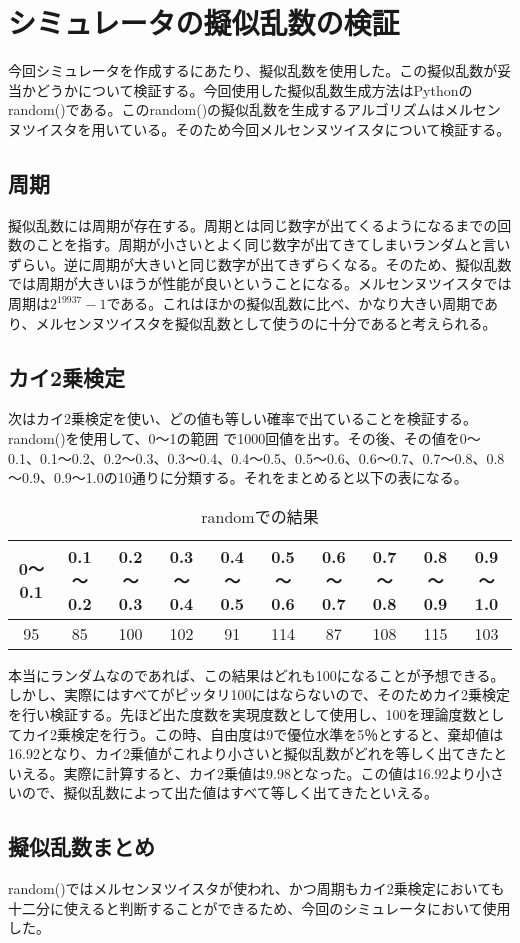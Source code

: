 \section{シミュレータの擬似乱数の検証}
今回シミュレータを作成するにあたり、擬似乱数を使用した。この擬似乱数が妥当かどうかについて検証する。今回使用した擬似乱数生成方法はPythonのrandom()である。このrandom()の擬似乱数を生成するアルゴリズムはメルセンヌツイスタを用いている。そのため今回メルセンヌツイスタについて検証する。
\subsection{周期}
擬似乱数には周期が存在する。周期とは同じ数字が出てくるようになるまでの回数のことを指す。周期が小さいとよく同じ数字が出てきてしまいランダムと言いずらい。逆に周期が大きいと同じ数字が出てきずらくなる。そのため、擬似乱数では周期が大きいほうが性能が良いということになる。メルセンヌツイスタでは周期は$2^{19937}-1$である。これはほかの擬似乱数に比べ、かなり大きい周期であり、メルセンヌツイスタを擬似乱数として使うのに十分であると考えられる。
\subsection{カイ2乗検定}
次はカイ2乗検定を使い、どの値も等しい確率で出ていることを検証する。random()を使用して、0～1の範囲
で1000回値を出す。その後、その値を0～0.1、0.1～0.2、0.2～0.3、0.3～0.4、0.4～0.5、0.5～0.6、0.6～0.7、0.7～0.8、0.8～0.9、0.9～1.0の10通りに分類する。それをまとめると以下の表になる。
\begin{table}[H]
 \begin{center}
  \begin{tabular}{|c|c|c|c|c|c|c|c|c|c|}
    \hline    0～0.1 &  0.1～0.2 & 0.2～0.3 & 0.3～0.4 &  0.4～0.5 & 0.5～0.6 & 0.6～0.7 & 0.7～0.8 & 0.8～0.9 & 0.9～1.0 \\
    \hline 95 & 85 & 100 & 102 & 91 & 114 & 87 & 108 & 115 & 103 \\
    \hline
  \end{tabular}
 \end{center}
 \caption{randomでの結果}
\end{table}
本当にランダムなのであれば、この結果はどれも100になることが予想できる。しかし、実際にはすべてがピッタリ100にはならないので、そのためカイ2乗検定を行い検証する。先ほど出た度数を実現度数として使用し、100を理論度数としてカイ2乗検定を行う。この時、自由度は9で優位水準を5％とすると、棄却値は16.92となり、カイ2乗値がこれより小さいと擬似乱数がどれを等しく出てきたといえる。実際に計算すると、カイ2乗値は9.98となった。この値は16.92より小さいので、擬似乱数によって出た値はすべて等しく出てきたといえる。
\subsection{擬似乱数まとめ}
random()ではメルセンヌツイスタが使われ、かつ周期もカイ2乗検定においても十二分に使えると判断することができるため、今回のシミュレータにおいて使用した。

